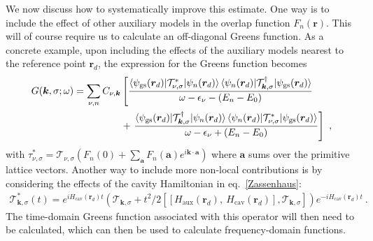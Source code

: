 We now discuss how to systematically improve this estimate. One way is to include the effect of other auxiliary models in the overlap function \(F_n(\bm r)\). This will of course require us to calculate an off-diagonal Greens function. As a concrete example, upon including the effects of the auxiliary models nearest to the reference point \(\bm r_d\), the expression for the Greens function becomes
\begin{equation}\begin{aligned}
	G(\bm k,\sigma;\omega) = \sum_{\nu, n} C_{\nu,\bm k} &\left[\frac{\braket{\psi_\text{gs}({\bm r_d}) | \mathcal{T}_{\nu,\sigma}^* | \psi_{n}({\bm r_d})}\braket{\psi_n({\bm r_d}) | \mathcal{T}_{\bm k,\sigma}^\dagger | \psi_\text{gs}({\bm r_d})}}{\omega - \epsilon_\nu - (E_n - E_0)}\right.\\
					   &+ \left.\frac{\braket{\psi_\text{gs}({\bm r_d}) | \mathcal{T}^\dagger_{\bm k,\sigma} | \psi_{n}({\bm r_d})}\braket{\psi_n({\bm r_d}) | \mathcal{T}_{\nu,\sigma}^* | \psi_\text{gs}({\bm r_d})}}{\omega - \epsilon_\nu + (E_n - E_0)}\right]~,
\end{aligned}\end{equation}
with \(\tau^*_{\nu,\sigma} = \mathcal{T}_{\nu,\sigma} (F_n(0) + \sum_{\bm a}F_n(\bm a)e^{i \bm k \cdot \bm a})\) where \(\bm a\) sums over the primitive lattice vectors. Another way to include more non-local contributions is by considering the effects of the cavity Hamiltonian in eq.~\ref{Zassenhaus}:
\begin{equation}\begin{aligned}
	\mathcal{T}_{{\bm k},\sigma}^*(t) = e^{i H_\text{cav}(\bm r_d)t}(\mathcal{T}_{{\bm k},\sigma} + t^2/2\left[[H_\text{aux}(\bm r_d),~H_\text{cav}(\bm r_d)], \mathcal{T}_{{\bm k},\sigma}\right])e^{-i H_\text{cav}(\bm r_d)t}~.
\end{aligned}\end{equation}
The time-domain Greens function associated with this operator will then need to be calculated, which can then be used to calculate frequency-domain functions.


